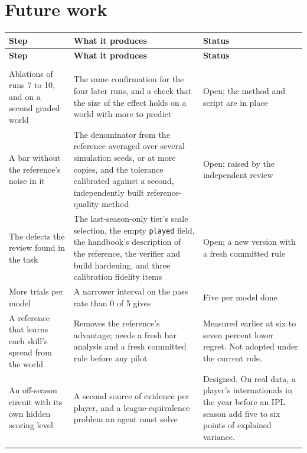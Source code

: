 \documentclass[11pt,letterpaper]{article}
\begin{document}
\section{Future work}

\begin{small}
\begin{longtable}{>{\raggedright\arraybackslash}p{}>{\raggedright\arraybackslash}p{}>{\raggedright\arraybackslash}p{}}
\toprule
\textbf{Step} & \textbf{What it produces} & \textbf{Status} \\ \midrule
\endfirsthead
\toprule
\textbf{Step} & \textbf{What it produces} & \textbf{Status} \\ \midrule
\endhead
\midrule \multicolumn{3}{r}{\footnotesize continued on the next page} \\ \endfoot
\bottomrule \endlastfoot
Ablations of runs 7 to 10, and on a second graded world & The same confirmation for the four later runs, and a check that the size of the effect holds on a world with more to predict & Open; the method and script are in place \\ \addlinespace[2pt]
A bar without the reference's noise in it & The denominator from the reference averaged over several simulation seeds, or at more copies, and the tolerance calibrated against a second, independently built reference-quality method & Open; raised by the independent review \\ \addlinespace[2pt]
The defects the review found in the task & The last-season-only tier's scale selection, the empty \texttt{played} field, the handbook's description of the reference, the verifier and build hardening, and three calibration fidelity items & Open; a new version with a fresh committed rule \\ \addlinespace[2pt]
More trials per model & A narrower interval on the pass rate than 0 of 5 gives & Five per model done \\ \addlinespace[2pt]
A reference that learns each skill's spread from the world & Removes the reference's advantage; needs a fresh bar analysis and a fresh committed rule before any pilot & Measured earlier at six to seven percent lower regret. Not adopted under the current rule. \\ \addlinespace[2pt]
An off-season circuit with its own hidden scoring level & A second source of evidence per player, and a league-equivalence problem an agent must solve & Designed. On real data, a player's internationals in the year before an IPL season add five to six points of explained variance. \\ \addlinespace[2pt]

\end{longtable}
\end{small}
\end{document}
